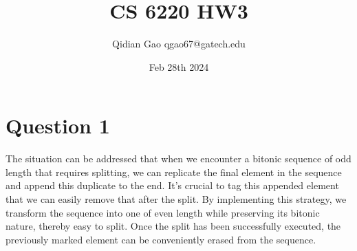 \documentclass{article}
\title{CS 6220 HW3}
\author{Qidian Gao qgao67@gatech.edu}
\date{Feb 28th 2024}
\begin{document}
\maketitle
\section{Question 1}
The situation can be addressed that when we encounter a bitonic sequence of odd length that requires splitting, we can replicate the final element in the sequence and append this duplicate to the end. It's crucial to tag this appended element that we can easily remove that after the split. By implementing this strategy, we transform the sequence into one of even length while preserving its bitonic nature, thereby easy to split. Once the split has been successfully executed, the previously marked element can be conveniently erased from the sequence. \par
\end{document}
